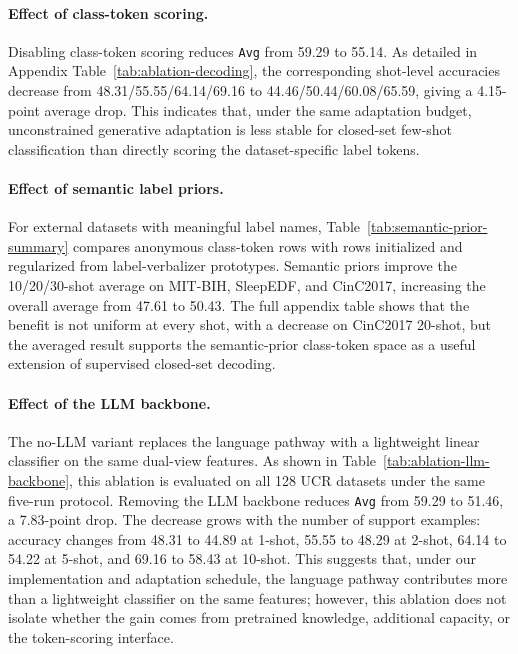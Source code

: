 \documentclass{article}
\begin{document}
\paragraph{Effect of class-token scoring.}
Disabling class-token scoring reduces \texttt{Avg} from 59.29 to 55.14. As detailed in Appendix Table~\ref{tab:ablation-decoding}, the corresponding shot-level accuracies decrease from 48.31/55.55/64.14/69.16 to 44.46/50.44/60.08/65.59, giving a 4.15-point average drop. This indicates that, under the same adaptation budget, unconstrained generative adaptation is less stable for closed-set few-shot classification than directly scoring the dataset-specific label tokens.

\paragraph{Effect of semantic label priors.}
For external datasets with meaningful label names, Table~\ref{tab:semantic-prior-summary} compares anonymous class-token rows with rows initialized and regularized from label-verbalizer prototypes. Semantic priors improve the 10/20/30-shot average on MIT-BIH, SleepEDF, and CinC2017, increasing the overall average from 47.61 to 50.43. The full appendix table shows that the benefit is not uniform at every shot, with a decrease on CinC2017 20-shot, but the averaged result supports the semantic-prior class-token space as a useful extension of supervised closed-set decoding.



\paragraph{Effect of the LLM backbone.}
The no-LLM variant replaces the language pathway with a lightweight linear classifier on the same dual-view features. As shown in Table~\ref{tab:ablation-llm-backbone}, this ablation is evaluated on all 128 UCR datasets under the same five-run protocol. Removing the LLM backbone reduces \texttt{Avg} from 59.29 to 51.46, a 7.83-point drop. The decrease grows with the number of support examples: accuracy changes from 48.31 to 44.89 at 1-shot, 55.55 to 48.29 at 2-shot, 64.14 to 54.22 at 5-shot, and 69.16 to 58.43 at 10-shot. This suggests that, under our implementation and adaptation schedule, the language pathway contributes more than a lightweight classifier on the same features; however, this ablation does not isolate whether the gain comes from pretrained knowledge, additional capacity, or the token-scoring interface.
\end{document}
